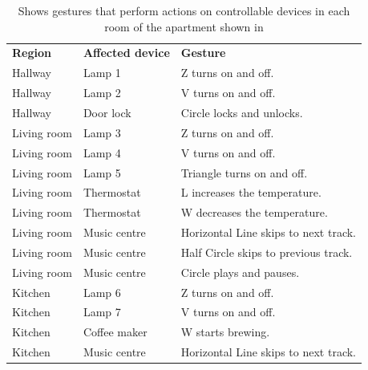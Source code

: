 \begin{table}[]
\centering
\caption{Shows gestures that perform actions on controllable devices in each room of the apartment shown in }
\label{tbl:analysis:scenario:gesture-configurations}
\begin{tabular}{lll}
\textbf{Region} & \textbf{Affected device} & \textbf{Gesture}                       \\
Hallway                    & Lamp 1                              & Z turns on and off.                      \\
Hallway                    & Lamp 2                              & V turns on and off.                      \\
Hallway                    & Door lock                           & Circle locks and unlocks.                \\
Living room                & Lamp 3                              & Z turns on and off.                      \\
Living room                & Lamp 4                              & V turns on and off.                      \\
Living room                & Lamp 5                              & Triangle turns on and off.               \\
Living room                & Thermostat                          & L increases the temperature.             \\
Living room                & Thermostat                          & W decreases the temperature.             \\
Living room                & Music centre                        & Horizontal Line skips to next track.     \\
Living room                & Music centre                        & Half Circle skips to previous track.     \\
Living room                & Music centre                        & Circle plays and pauses.                 \\
Kitchen                    & Lamp 6                              & Z turns on and off.                      \\
Kitchen                    & Lamp 7                              & V turns on and off.                      \\
Kitchen                    & Coffee maker                        & W starts brewing.                        \\
Kitchen                    & Music centre                        & Horizontal Line skips to next track.     \\

\end{tabular}
\end{table}
